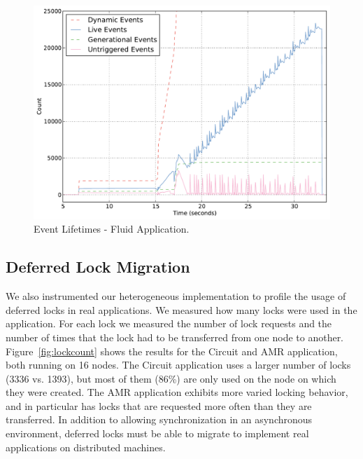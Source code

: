 \begin{figure}
\begin{center}
\includegraphics[scale=0.33]{figs/event_lifetimes.pdf}
\end{center}
\vspace{-2mm}
\caption{Event Lifetimes - Fluid Application.\label{fig:eventlife}}
\vspace{-4mm}
\end{figure}


\subsection{Deferred Lock Migration}
\label{subsec:lockmig}

We also instrumented our heterogeneous implementation to profile the usage of 
deferred locks in real applications.  We measured how many locks were used in the application.  For
each lock we measured the number of lock requests and the number of times that the lock
had to be transferred from one node to another.  Figure~\ref{fig:lockcount} shows the results 
for the Circuit and AMR application, both running on 16 nodes.  The Circuit application uses
a larger number of locks (3336 vs. 1393), but most of them (86\%) are only used on the node on 
which they were created.  The AMR application exhibits more varied locking behavior, and in 
particular has locks that are requested more often than they are transferred.  In addition
to allowing synchronization in an asynchronous environment, deferred locks must be able to 
migrate to implement real applications on distributed machines.

